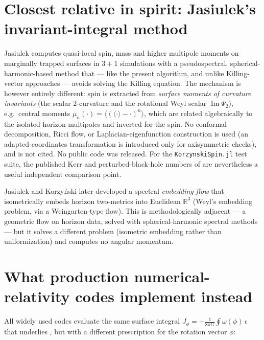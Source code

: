 \documentclass[11pt]{article}
\begin{document}
\section{Closest relative in spirit: Jasiulek's invariant-integral method}

Jasiulek \cite{jasiulek2009} computes quasi-local spin, mass and higher
multipole moments on marginally trapped surfaces in $3+1$ simulations with a
pseudospectral, spherical-harmonic-based method that --- like the present
algorithm, and unlike Killing-vector approaches --- avoids solving the
Killing equation.  The mechanism is however entirely different: spin is
extracted from \emph{surface moments of curvature invariants} (the scalar
2-curvature and the rotational Weyl scalar $\operatorname{Im}\Psi_2$), e.g.\
central moments $\mu_n(\cdot) = \langle(\langle\cdot\rangle-\cdot)^n\rangle$,
which are related algebraically to the isolated-horizon multipoles and
inverted for the spin.  No conformal decomposition, Ricci flow, or
Laplacian-eigenfunction construction is used (an adapted-coordinates
transformation is introduced only for axisymmetric checks), and
\cite{korzynski2007} is not cited.  No public code was released.  For the
\texttt{KorzynskiSpin.jl} test suite, the published Kerr and
perturbed-black-hole numbers of \cite{jasiulek2009} are nevertheless a
useful independent comparison point.

Jasiulek and Korzy\'nski later developed a spectral \emph{embedding flow}
\cite{jasiulek2012} that isometrically embeds horizon two-metrics into
Euclidean $\mathbb{R}^3$ (Weyl's embedding problem, via a Weingarten-type
flow).  This is methodologically adjacent --- a geometric flow on horizon
data, solved with spherical-harmonic spectral methods --- but it solves a
different problem (isometric embedding rather than uniformization) and
computes no angular momentum.

\section{What production numerical-relativity codes implement instead}

All widely used codes evaluate the same surface integral
$J_\phi = -\frac{1}{8\pi G}\oint\omega(\phi)\,\epsilon$ that underlies
\cite{korzynski2007}, but with a different prescription for the rotation
vector $\phi$:
\end{document}

